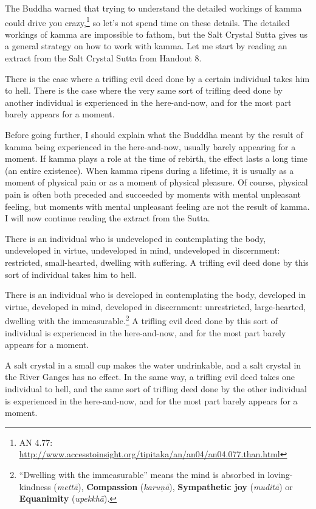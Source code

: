 The Buddha warned that trying to understand the detailed workings of kamma could drive you crazy,\footnote{AN 4.77: \url{http://www.accesstoinsight.org/tipitaka/an/an04/an04.077.than.html}} so let’s not spend time on these details. The detailed workings of kamma are impossible to fathom, but the Salt Crystal Sutta gives us a general strategy on how to work with kamma. Let me start by reading an extract from the Salt Crystal Sutta from Handout 8.

There is the case where a trifling evil deed done by a certain individual takes him to hell. There is the case where the very same sort of trifling deed done by another individual is experienced in the here-and-now, and for the most part barely appears for a moment.

\color{red}

Before going further, I should explain what the Budddha meant by the result of kamma being experienced in the here-and-now, usually barely appearing for a moment. If kamma plays a role at the time of rebirth, the effect lasts a long time (an entire existence). When kamma ripens during a lifetime, it is usually as a moment of physical pain or as a moment of physical pleasure. Of course, physical pain is often both preceded and succeeded by moments with mental unpleasant feeling, but moments with mental unpleasant feeling are not the result of kamma. I will now continue reading the extract from the Sutta.

\color {black}

There is an individual who is undeveloped in contemplating the body, undeveloped in virtue, undeveloped in mind, undeveloped in discernment: restricted, small-hearted, dwelling with suffering. A trifling evil deed done by this sort of individual takes him to hell.

There is an individual who is developed in contemplating the body, developed in virtue, developed in mind, developed in discernment: unrestricted, large-hearted, dwelling with the immeasurable.\footnote{“Dwelling with the immeasurable” means the mind is absorbed in loving-kindness (\textit{mettā}), \textbf{Compassion} (\textit{karuṇā}), \textbf{Sympathetic joy} (\textit{muditā}) or \textbf{Equanimity} (\textit{upekkhā}).} A trifling evil deed done by this sort of individual is experienced in the here-and-now, and for the most part barely appears for a moment.

A salt crystal in a small cup makes the water undrinkable, and a salt crystal in the River Ganges has no effect. In the same way, a trifling evil deed takes one individual to hell, and the same sort of trifling deed done by the other individual is experienced in the here-and-now, and for the most part barely appears for a moment.

